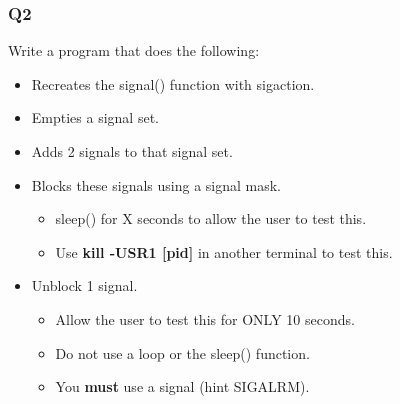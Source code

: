 \documentclass{article}
\begin{document}
\subsubsection{Q2}
Write a program that does the following:
\begin{itemize}
    \item Recreates the signal() function with sigaction.
    \item Empties a signal set.
    \item Adds 2 signals to that signal set.
    \item Blocks these signals using a signal mask.
        \begin{itemize}
            \item sleep() for X seconds to allow the user to test this.
            \item Use \textbf{kill -USR1 [pid]} in another terminal to test this.
        \end{itemize}
    \item Unblock 1 signal.
        \begin{itemize}
            \item Allow the user to test this for ONLY 10 seconds.
            \item Do not use a loop or the sleep() function.
            \item You \textbf{must} use a signal (hint SIGALRM).
        \end{itemize}
\end{itemize}
\end{document}

